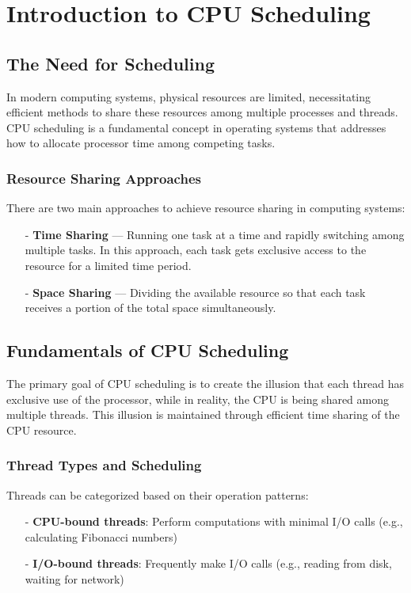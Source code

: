 \documentclass[../../compsys.tex]{subfiles}
\begin{document}
\chapter{Introduction to CPU Scheduling}
\vfill
\section{The Need for Scheduling}
In modern computing systems, physical resources are limited, necessitating efficient methods to share these resources among multiple processes and threads. CPU scheduling is a fundamental concept in operating systems that addresses how to allocate processor time among competing tasks.

\subsection{Resource Sharing Approaches}
There are two main approaches to achieve resource sharing in computing systems:

\begin{itemize}
    \item[-] \textbf{Time Sharing} — Running one task at a time and rapidly switching among multiple tasks. In this approach, each task gets exclusive access to the resource for a limited time period.
    \item[-] \textbf{Space Sharing} — Dividing the available resource so that each task receives a portion of the total space simultaneously.
\end{itemize}

\newpage
\section{Fundamentals of CPU Scheduling}
The primary goal of CPU scheduling is to create the illusion that each thread has exclusive use of the processor, while in reality, the CPU is being shared among multiple threads. This illusion is maintained through efficient time sharing of the CPU resource.
  
\subsection{Thread Types and Scheduling}
Threads can be categorized based on their operation patterns:
\begin{itemize}
    \item[-] \textbf{CPU-bound threads}: Perform computations with minimal I/O calls (e.g., calculating Fibonacci numbers)
    \item[-] \textbf{I/O-bound threads}: Frequently make I/O calls (e.g., reading from disk, waiting for network)
\end{itemize}
\end{document}
